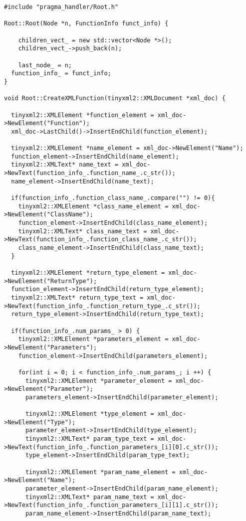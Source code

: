 \documentclass[a4paper,10pt,twoside]{book}
\begin{document}
\begin{lstlisting}[language=CCC, caption=pragma\_handler/Root.cpp]
#include "pragma_handler/Root.h"

Root::Root(Node *n, FunctionInfo funct_info) {

	children_vect_ = new std::vector<Node *>();
	children_vect_->push_back(n);

	last_node_ = n;
  function_info_ = funct_info;
}

void Root::CreateXMLFunction(tinyxml2::XMLDocument *xml_doc) {

  tinyxml2::XMLElement *function_element = xml_doc->NewElement("Function");
  xml_doc->LastChild()->InsertEndChild(function_element);

  tinyxml2::XMLElement *name_element = xml_doc->NewElement("Name");
  function_element->InsertEndChild(name_element); 
  tinyxml2::XMLText* name_text = xml_doc->NewText(function_info_.function_name_.c_str());
  name_element->InsertEndChild(name_text);

  if(function_info_.function_class_name_.compare("") != 0){
    tinyxml2::XMLElement *class_name_element = xml_doc->NewElement("ClassName");
    function_element->InsertEndChild(class_name_element); 
    tinyxml2::XMLText* class_name_text = xml_doc->NewText(function_info_.function_class_name_.c_str());
    class_name_element->InsertEndChild(class_name_text);
  }
    
  tinyxml2::XMLElement *return_type_element = xml_doc->NewElement("ReturnType");
  function_element->InsertEndChild(return_type_element);
  tinyxml2::XMLText* return_type_text = xml_doc->NewText(function_info_.function_return_type_.c_str());
  return_type_element->InsertEndChild(return_type_text);

  if(function_info_.num_params_ > 0) {
    tinyxml2::XMLElement *parameters_element = xml_doc->NewElement("Parameters");
    function_element->InsertEndChild(parameters_element);

    for(int i = 0; i < function_info_.num_params_; i ++) {
      tinyxml2::XMLElement *parameter_element = xml_doc->NewElement("Parameter");
      parameters_element->InsertEndChild(parameter_element);

      tinyxml2::XMLElement *type_element = xml_doc->NewElement("Type");
      parameter_element->InsertEndChild(type_element);
      tinyxml2::XMLText* param_type_text = xml_doc->NewText(function_info_.function_parameters_[i][0].c_str());
      type_element->InsertEndChild(param_type_text);

      tinyxml2::XMLElement *param_name_element = xml_doc->NewElement("Name");
      parameter_element->InsertEndChild(param_name_element);
      tinyxml2::XMLText* param_name_text = xml_doc->NewText(function_info_.function_parameters_[i][1].c_str());
      param_name_element->InsertEndChild(param_name_text);


\end{lstlisting}
\end{document}
